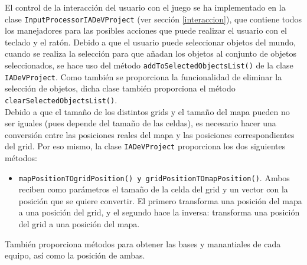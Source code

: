 El control de la interacción del usuario con el juego se ha implementado en la clase \texttt{InputProcessorIADeVProject} (ver sección \ref{interaccion}), que contiene todos los manejadores para las posibles acciones que puede realizar el usuario con el teclado y el ratón. Debido a que el usuario puede seleccionar objetos del mundo, cuando se realiza la selección para que añadan los objetos al conjunto de objetos seleccionados, se hace uso del método \texttt{addToSelectedObjectsList()} de la clase \texttt{IADeVProject}. Como también se proporciona la funcionalidad de eliminar la selección de objetos, dicha clase también proporciona el método \texttt{clearSelectedObjectsList()}. \\

Debido a que el tamaño de los distintos grids y el tamaño del mapa pueden no ser iguales (pues depende del tamaño de las celdas), es necesario hacer una conversión entre las posiciones reales del mapa y las posiciones correspondientes del grid. Por eso mismo, la clase \texttt{IADeVProject} proporciona los dos siguientes métodos:
\begin{itemize}
 \item \texttt{mapPositionTOgridPosition() y gridPositionTOmapPosition()}. Ambos reciben como parámetros el tamaño de la celda del grid y un vector con la posición que se quiere convertir. El primero transforma una posición del mapa a una posición del grid, y el segundo hace la inversa: transforma una posición del grid a una posición del mapa.
\end{itemize}

También proporciona métodos para obtener las bases y manantiales de cada equipo, así como la posición de ambas.

